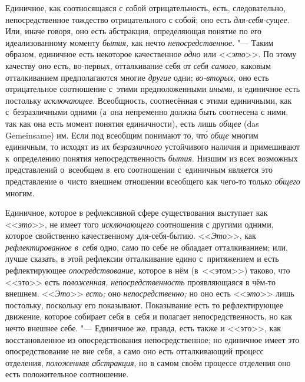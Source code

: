 Единичное, как соотносящаяся с собой отрицательность, есть, следовательно,
непосредственное тождество отрицательного с собой; оно есть
{\em для-себя-сущее}. Или, иначе говоря, оно есть абстракция, определяющая
понятие по его идеализованному моменту {\em бытия,} как нечто
{\em непосредственное}. "--- Таким образом, единичное есть некоторое
качественное {\em одно} или <<{\em это}>>. По этому качеству оно есть,
во-первых, отталкивание себя от {\em себя самого,} каковым отталкиванием
предполагаются многие {\em другие} одни; {\em во-вторых,} оно есть
отрицательное соотношение с~этими предположенными {\em иными,} и единичное есть
постольку {\em исключающее}. Всеобщность, соотнесённая с этими единичными, как
с~безразличными одними (а~она непременно должна быть соотнесена с ними, так как
она есть момент понятия единичности), есть лишь {\em общее} (das Gemein\-same)
им. Если под всеобщим понимают то, чт\'{о} {\em обще} многим единичным, то
исходят из их {\em безразличного} устойчивого наличия и примешивают
к~определению понятия непосредственность {\em бытия}. Низшим из всех возможных
представлений о~всеобщем в~его соотношении с~единичным является это
представление о~чисто внешнем отношении всеобщего как чего-то только
{\em общего} многим.

Единичное, которое в рефлексивной сфере существования
выступает как <<{\em это}>>, не имеет того {\em исключающего}
соотношения с другими одними, которое свойственно качественному для-себя-бытию.
<<{\em Это}>>, как {\em рефлектированное в~себя}
одно, само по себе не обладает отталкиванием; или, лучше
сказать, в этой рефлексии отталкивание едино
с~притяжением и есть рефлектирующее {\em опосредствование,}
которое в нём (в~<<этом>>) таково, что <<это>> есть {\em положенная,}
{\em непосредственность} проявляющаяся в чём-то внешнем. <<{\em Это}>>
{\em есть;} оно {\em непосредственно;} но оно есть <<{\em это}>> лишь
постольку, поскольку его показывают. Показывание есть то рефлектирующее
движение, которое собирает себя в~себя и полагает непосредственность, но
как нечто внешнее себе. "--- Единичное же,
правда, есть также и <<это>>, как восстановленное из опосредствования
непосредственное; но единичное имеет это опосредствование не вне себя, а
само оно есть отталкивающий процесс отделения, {\em положенная
абстракция},
но в самом своём процессе отделения оно есть положительное соотношение.

